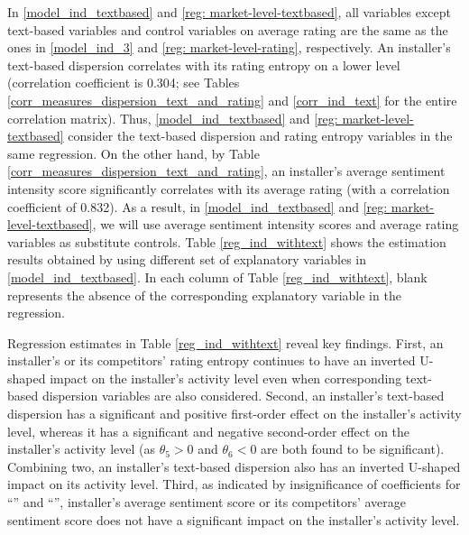 \documentclass[msom,blindrev]{informs3}
\begin{document}
	In \eqref{model_ind_textbased} and \eqref{reg: market-level-textbased}, all variables except text-based variables and control variables on average rating are the same as the ones in \eqref{model_ind_3} and \eqref{reg: market-level-rating}, respectively. An installer's text-based dispersion correlates with its rating entropy on a lower level (correlation coefficient is 0.304; see Tables \ref{corr_measures_dispersion_text_and_rating} and \ref{corr_ind_text} for the entire correlation matrix). Thus, \eqref{model_ind_textbased} and \eqref{reg: market-level-textbased} consider the text-based dispersion and rating entropy variables in the same regression. On the other hand, by Table \ref{corr_measures_dispersion_text_and_rating}, an installer's average sentiment intensity score significantly correlates with its average rating (with a correlation coefficient of 0.832). As a result, in \eqref{model_ind_textbased} and \eqref{reg: market-level-textbased},  we will use average sentiment intensity scores and average rating variables as substitute controls. Table \ref{reg_ind_withtext} shows the estimation results obtained by using different set of explanatory variables in \eqref{model_ind_textbased}. In each column of Table \ref{reg_ind_withtext}, blank represents the absence of the corresponding explanatory variable in the regression.
	
	

	
	Regression estimates in Table \ref{reg_ind_withtext} reveal key findings. First, an installer's or its competitors' rating entropy continues to have an inverted U-shaped impact on the installer's activity level even when corresponding text-based dispersion variables are also considered.  Second, an installer's text-based dispersion has a significant and positive first-order effect on the installer's activity level, whereas it has a significant and negative second-order effect on the installer's activity level (as $\theta_{5} > 0$ and $\theta_{6} < 0$ are both found to be significant). Combining two, an installer's text-based dispersion also has an inverted U-shaped impact on its activity level. Third, as indicated by insignificance of coefficients for ``'' and ``'', installer's average sentiment score or its competitors' average sentiment score does not have a significant impact on the installer's activity level.
	
\end{document}

